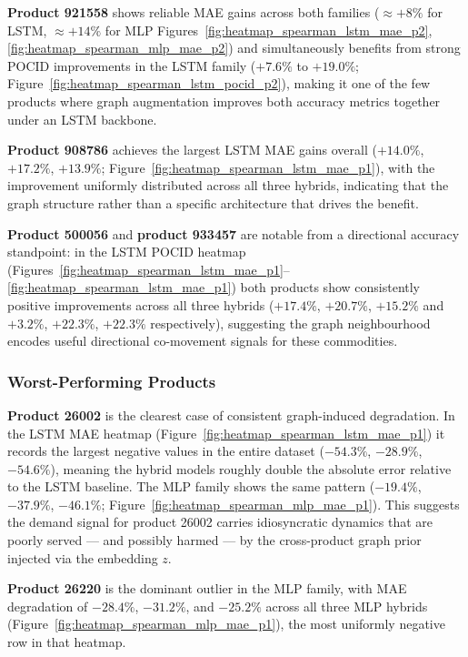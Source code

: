 \textbf{Product 921558} shows reliable MAE gains across both families
(\(\approx +8\%\) for LSTM, \(\approx +14\%\) for MLP
Figures~\ref{fig:heatmap_spearman_lstm_mae_p2}, \ref{fig:heatmap_spearman_mlp_mae_p2}) and
simultaneously benefits from strong POCID improvements in the LSTM family
(\(+7.6\%\) to \(+19.0\%\); Figure~\ref{fig:heatmap_spearman_lstm_pocid_p2}), making it
one of the few products where graph augmentation improves both accuracy metrics
together under an LSTM backbone.

\textbf{Product 908786} achieves the largest LSTM MAE gains overall (\(+14.0\%\),
\(+17.2\%\), \(+13.9\%\); Figure~\ref{fig:heatmap_spearman_lstm_mae_p1}), with the
improvement uniformly distributed across all three hybrids, indicating that the
graph structure rather than a specific architecture that drives the benefit.

\textbf{Product 500056} and \textbf{product 933457} are notable from a directional
accuracy standpoint: in the LSTM POCID heatmap
(Figures~\ref{fig:heatmap_spearman_lstm_mae_p1}--\ref{fig:heatmap_spearman_lstm_mae_p1}) both
products show consistently positive improvements across all three hybrids
(\(+17.4\%\), \(+20.7\%\), \(+15.2\%\) and \(+3.2\%\), \(+22.3\%\), \(+22.3\%\)
respectively), suggesting the graph neighbourhood encodes useful directional
co-movement signals for these commodities.

\subsubsection*{Worst-Performing Products}
\textbf{Product 26002} is the clearest case of consistent graph-induced degradation.
In the LSTM MAE heatmap (Figure~\ref{fig:heatmap_spearman_lstm_mae_p1}) it records the
largest negative values in the entire dataset (\(-54.3\%\), \(-28.9\%\),
\(-54.6\%\)), meaning the hybrid models roughly double the absolute error relative
to the LSTM baseline. The MLP family shows the same pattern (\(-19.4\%\),
\(-37.9\%\), \(-46.1\%\); Figure~\ref{fig:heatmap_spearman_mlp_mae_p1}). This suggests the
demand signal for product 26002 carries idiosyncratic dynamics that are poorly
served — and possibly harmed — by the cross-product graph prior injected via the
embedding $z$.

\textbf{Product 26220} is the dominant outlier in the MLP family, with MAE
degradation of \(-28.4\%\), \(-31.2\%\), and \(-25.2\%\) across all three MLP
hybrids (Figure~\ref{fig:heatmap_spearman_mlp_mae_p1}), the most uniformly negative row
in that heatmap.

